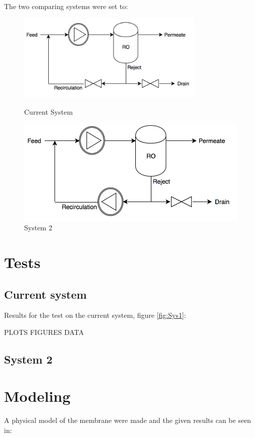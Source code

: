 The two comparing systems were set to:\\
\begin{figure}[h]
\centering
\begin{minipage}{.5\textwidth}
    \centering
    \includegraphics[width=0.8\textwidth]{Sys1}
    \caption{Current System}
    \label{fig:System1}
\end{minipage}%
\begin{minipage}{.5\textwidth}
  \centering
  \includegraphics[width=.8\linewidth]{Sys2}
  \caption{System 2}
  \label{fig:System2}
\end{minipage}
\end{figure}

\section{Tests}
\subsection{Current system}
Results for the test on the current system, figure \ref{fig:Sys1}:

PLOTS FIGURES DATA

\subsection{System 2}


\section{Modeling}
A physical model of the membrane were made and the given results can be seen in: 

